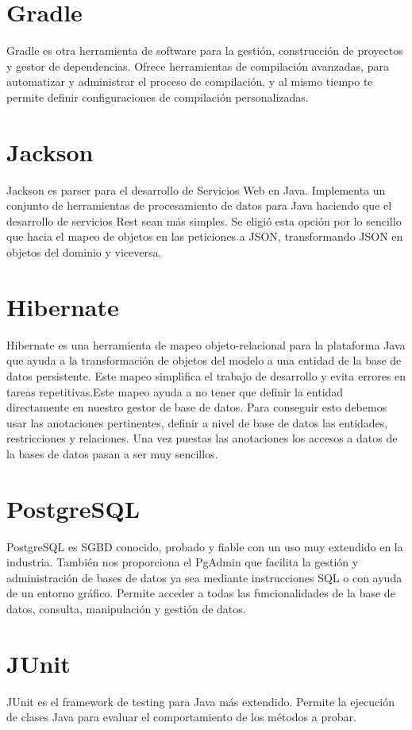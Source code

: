 \section{Gradle}
Gradle es otra herramienta de software para la gestión, construcción de proyectos y gestor de dependencias. Ofrece
  herramientas de compilación avanzadas, para automatizar y administrar el proceso de compilación, y al mismo tiempo te permite definir configuraciones de compilación personalizadas.



\section{Jackson}

Jackson es parser para el desarrollo de Servicios Web en Java. Implementa un conjunto de   herramientas de procesamiento de datos para Java haciendo que el desarrollo de servicios Rest sean más simples. Se eligió esta opción por lo sencillo que hacia el mapeo de objetos en las peticiones a JSON, transformando  JSON en objetos del dominio y viceversa.








\section{Hibernate}
Hibernate  \cite{4} es una herramienta de mapeo objeto-relacional para la plataforma Java que ayuda a la transformación de objetos del modelo a una entidad de la base de datos persistente. Este mapeo simplifica el trabajo de desarrollo y evita errores en tareas repetitivas.Este mapeo ayuda a  no tener que definir la entidad directamente en nuestro gestor de base de datos. Para conseguir esto debemos usar las anotaciones pertinentes, definir a nivel de base de datos las entidades, restricciones y relaciones. Una vez puestas las anotaciones los accesos a datos de la  bases de datos pasan a ser muy sencillos.





\section{PostgreSQL}
PostgreSQL es SGBD conocido, probado y fiable con un uso muy extendido en la industria. También nos proporciona  el PgAdmin que facilita la gestión y administración de bases de datos ya sea mediante instrucciones SQL o con ayuda de un entorno gráfico. Permite acceder a todas las funcionalidades de la base de datos, consulta, manipulación y gestión de datos.
\section{JUnit}
JUnit es el framework de testing para Java más extendido.
Permite la ejecución de clases Java para evaluar el comportamiento de los métodos a probar.


\vspace{1cm}


